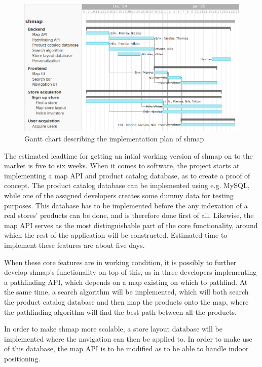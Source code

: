 \documentclass[titlepage]{article}
\def\companyName{shmap}
\begin{document}
\begin{figure}[h]
    \centering
    \includegraphics[width=1\textwidth]{implementation_plan.png}
    \caption{Gantt chart describing the implementation plan of \companyName}
    \label{fig:ganttchart}
\end{figure}

The estimated leadtime for getting an intial working version of shmap on to the market is five to six weeks. When it comes to software, the project starts at implementing a map API and product catalog database, as to create a proof of concept. The product catalog database can be implemented using e.g. MySQL, while one of the assigned developers creates some dummy data for testing purposes. This database has to be implemented before the any indexation of a real stores' products can be done, and is therefore done first of all. Likewise, the map API serves as the most distinguishable part of the core functionality, around which the rest of the application will be constructed. Estimated time to implement these features are about five days.

When these core features are in working condition, it is possibly to further develop shmap's functionality on top of this, as in three developers implementing a pathfinding API, which depends on a map existing on which to pathfind. At the same time, a search algorithm will be implemented, which will both search the product catalog database and then map the products onto the map, where the pathfinding algorithm will find the best path between all the products.

In order to make shmap more scalable, a store layout database will be implemented where the navigation can then be applied to. In order to make use of this database, the map API is to be modified as to be able to handle indoor positioning.
\end{document}
